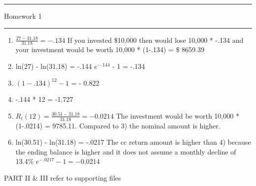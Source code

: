 \documentclass[letterpaper,12pt]{article}
\begin{document}
\thispagestyle{fancy}
\renewcommand{\headrulewidth}{0pt}
\hrule \vspace{0.5em}
 \hfill Homework 1 \newline \hrule

\begin{enumerate}
\item $\frac{27-31.18}{31.18} = -.134	$
 If you invested \$10,000 then would lose 10,000 * -.134 and your investment would be worth 10,000 * (1-.134) = \$ 8659.39

\item ln(27) - ln(31.18) = -.144
 $e^{-.144}$ - 1 = -.134

\item $(1-.134)^{12} - 1$ = - 0.822
\item -.144 * 12 = -1.727

\item $R_t(12) = \frac{30.51 - 31.18}{31.18} = -0.0214$
 The investment would be worth 10,000 *(1-.0214) = 9785.11. Compared to 3) the nominal amount is higher. 

\item ln(30.51) - ln(31.18) = -.0217
The cc return amount is higher than 4) because the ending balance is higher and it does not assume a monthly decline of 13.4\%
 $e^{-.0217} - 1 = -0.0214$
\end{enumerate}
PART II \& III refer to supporting files
\end{document}
